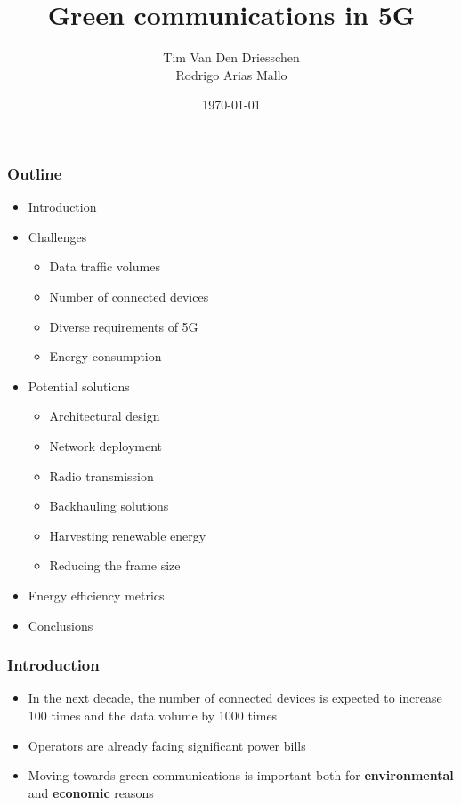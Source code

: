 \documentclass[a4paper,11pt,handout]{beamer}
\title{Green communications in 5G}
\author{Tim Van Den Driesschen\\Rodrigo Arias Mallo}
\institute{Universitat Politècnica de Catalunya}
\date{\today}
\begin{document}
\begin{frame}
	\titlepage
\end{frame}
\note{}
\begin{frame}
\frametitle{Outline}

\begin{itemize}
	\item Introduction
	\item Challenges
	\begin{itemize}
		\item Data traffic volumes
		\item Number of connected devices
		\item Diverse requirements of 5G
		\item Energy consumption
	\end{itemize}
	\item Potential solutions
	\begin{itemize}
		\item Architectural design
		\item Network deployment
		\item Radio transmission
		\item Backhauling solutions
		\item Harvesting renewable energy
		\item Reducing the frame size
	\end{itemize}
	\item Energy efficiency metrics
	\item Conclusions
\end{itemize}

\end{frame}
\note{%
}
\begin{frame}
\frametitle{Introduction}
\begin{itemize}

\item In the next decade, the number of connected devices is expected to 
increase 100 times and the data volume by 1000 times

\item Operators are already facing significant power bills

\item Moving towards green communications is important both for 
\textbf{environmental} and \textbf{economic} reasons

\end{itemize}
\end{frame}
\end{document}
